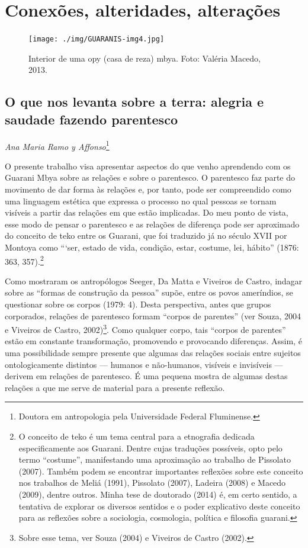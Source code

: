 \part{Conexões, alteridades, alterações}
 
\begin{figure}
  \centering
 \texttt{[image: ./img/GUARANIS-img4.jpg]}	
  \hfill
  \caption{Interior de uma opy (casa de reza) mbya. Foto: Valéria Macedo, 2013.}
\end{figure}


\chapter{O que nos levanta sobre a terra: alegria e saudade fazendo
parentesco}
\begin{flushright}
\emph{Ana Maria Ramo y Affonso}\footnote{Doutora em antropologia pela
Universidade Federal Fluminense.}
\end{flushright}

O presente trabalho visa apresentar aspectos do que venho aprendendo com
os Guarani Mbya sobre as relações e sobre o parentesco. O parentesco
faz parte do movimento de dar forma às relações e, por tanto, pode ser
compreendido como uma linguagem estética que expressa o processo no
qual pessoas se tornam visíveis a partir das relações em que estão
implicadas. Do meu ponto de vista, esse modo de pensar o parentesco e
as relações de diferença pode ser aproximado do conceito de teko entre
os Guarani, que foi traduzido já no século XVII por Montoya como ``‘ser,
estado de vida, condição, estar, costume, lei, hábito'' (1876: 363,
357).\footnote{O conceito de teko é um tema central para a etnografia
dedicada especificamente aos Guarani. Dentre cujas traduções possíveis,
opto pelo termo ``costume'', manifestando uma aproximação ao trabalho de
Pissolato (2007). Também podem se encontrar importantes reflexões sobre
este conceito nos trabalhos de Meliá (1991), Pissolato (2007), Ladeira
(2008) e Macedo (2009), dentre outros. Minha tese de doutorado (2014)
é, em certo sentido, a tentativa de explorar os diversos sentidos e o
poder explicativo deste conceito para as reflexões sobre a sociologia,
cosmologia, política e filosofia guarani.}

Como mostraram os antropólogos Seeger, Da Matta e Viveiros de Castro,
indagar sobre as ``formas de construção da pessoa'' supõe, entre os povos
ameríndios, se questionar sobre os corpos (1979: 4). Desta perspectiva,
antes que grupos corporados, relações de parentesco formam ``corpos de
parentes'' (ver Souza, 2004 e Viveiros de Castro, 2002)\footnote{Sobre
esse tema, ver Souza (2004) e Viveiros de Castro (2002).}. Como
qualquer corpo, tais ``corpos de parentes'' estão em constante
transformação, promovendo e provocando diferenças. Assim, é uma
possibilidade sempre presente que algumas das relações sociais entre
sujeitos ontologicamente distintos — humanos e não-humanos, visíveis e
invisíveis — derivem em relações de parentesco. É uma pequena mostra de
algumas destas relações a que me serve de material para a presente
reflexão.

